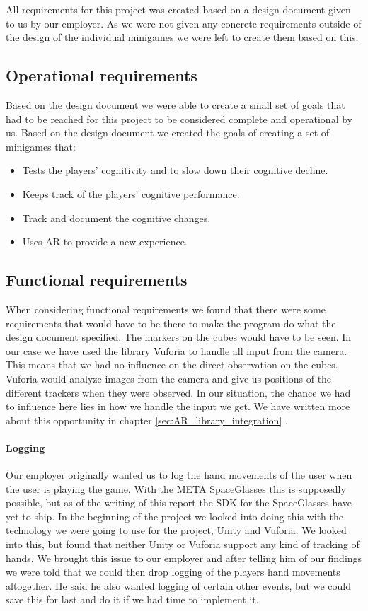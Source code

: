 All requirements for this project was created based on a design document given to us by our employer.
As we were not given any concrete requirements outside of the design of the individual minigames we
were left to create them based on this.


\subsection{Operational requirements}
Based on the design document we were able to create a small set of goals that had to be reached for this project
to be considered complete and operational by us.
Based on the design document we created the goals of creating a set of minigames that:
\begin{itemize}
	\item Tests the players' cognitivity and to slow down their cognitive decline.
	\item Keeps track of the players' cognitive performance.
	\item Track and document the cognitive changes.
	\item Uses AR to provide a new experience.
\end{itemize}

\subsection{Functional requirements}
When considering functional requirements we found that there were some requirements that would have to be there to make the program do what the design document specified. 
The markers on the cubes would have to be seen. 
In our case we have used the library \gls{Vuforia} to handle all input from the camera.
This means that we had no influence on the direct observation on the cubes. 
Vuforia would analyze images from the camera and give us positions of the different trackers when they were observed. 
In our situation, the chance we had to influence here lies in how we handle the input we get. 
We have written more about this opportunity in chapter \ref{sec:AR_library_integration} .

\paragraph{Logging}
Our employer originally wanted us to log the hand movements of the user when the user is playing the game. 
With the META SpaceGlasses this is supposedly possible, but as of the writing of this report the SDK for the SpaceGlasses have yet to ship. 
In the beginning of the project we looked into doing this with the technology we were going to use for the project, Unity and Vuforia. 
We looked into this, but found that neither Unity or Vuforia support any kind of tracking of hands. 
We brought this issue to our employer and after telling him of our findings we were told that we could then drop logging of the players hand movements altogether. 
He said he also wanted logging of certain other events, but we could save this for last and do it if we had time to implement it.

